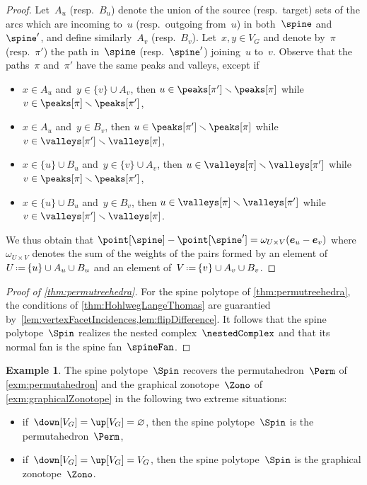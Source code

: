 \documentclass{amsart}
\theoremstyle{definition}
\newtheorem{example}[theorem]{Example}
\renewcommand{\b}[1]{{\boldsymbol{#1}}} %
\newcommand{\ssm}{\smallsetminus} %
\newcommand{\eqdef}{\mbox{\,\raisebox{0.2ex}{\scriptsize\ensuremath{\mathrm:}}\ensuremath{=}\,}} %
\newcommand{\weight}{\omega} %
\begin{document}
\begin{proof}
  Let~$A_u$ (resp.~$B_u$) denote the union of the source (resp.~target) sets of the arcs which are incoming to~$u$ (resp.~outgoing from~$u$) in both~$\spine$ and~$\spine'$, and define similarly~$A_v$ (resp.~$B_v$).
  Let~$x,y \in V_G$ and denote by~$\pi$ (resp.~$\pi'$) the path in~$\spine$ (resp.~$\spine'$) joining~$u$ to~$v$.
  Observe that the paths~$\pi$ and~$\pi'$ have the same peaks and valleys, except if
  \begin{itemize}
    \item $x \in A_u$ and~$y \in \{v\} \cup A_v$, then $u \in \peaks[\pi'] \ssm \peaks[\pi]$ while~$v \in \peaks[\pi] \ssm \peaks[\pi']$,
    \item $x \in A_u$ and~$y \in B_v$, then $u \in \peaks[\pi'] \ssm \peaks[\pi]$ while~$v \in \valleys[\pi'] \ssm \valleys[\pi]$,
    \item $x \in \{u\} \cup B_u$ and~$y \in \{v\} \cup A_v$, then $u \in \valleys[\pi] \ssm \valleys[\pi']$ while~$v \in \peaks[\pi] \ssm \peaks[\pi']$,
    \item $x \in \{u\} \cup B_u$ and~$y \in B_v$, then $u \in \valleys[\pi] \ssm \valleys[\pi']$ while~$v \in \valleys[\pi'] \ssm \valleys[\pi]$.
  \end{itemize}
  We thus obtain that
  \(
    \point[\spine] - \point[\spine'] = \weight_{U \times V} (\b{e}_u - \b{e}_v)
  \)
  where~$\weight_{U \times V}$ denotes the sum of the weights of the pairs formed by an element of~$U \eqdef \{u\} \cup A_u \cup B_u$ and an element of~$V \eqdef \{v\} \cup A_v \cup B_v$.
\end{proof}

\begin{proof}[Proof of \cref{thm:permutreehedra}]
  For the spine polytope of \cref{thm:permutreehedra}, the conditions of \cref{thm:HohlwegLangeThomas} are guarantied by~\cref{lem:vertexFacetIncidences,lem:flipDifference}.
  It follows that the spine polytope~$\Spin$ realizes the nested complex~$\nestedComplex$ and that its normal fan is the spine fan~$\spineFan$.
\end{proof}

\begin{example}
  \label{exm:permutahedronGraphicalZonotope}
  The spine polytope~$\Spin$ recovers the permutahedron~$\Perm$ of \cref{exm:permutahedron} and the graphical zonotope~$\Zono$ of \cref{exm:graphicalZonotope} in the following two extreme situations:
  \begin{itemize}
    \item if~$\down[V_G] = \up[V_G] = \varnothing$, then the spine polytope~$\Spin$ is the permutahedron~$\Perm$,
    \item if~$\down[V_G] = \up[V_G] = V_G$, then the spine polytope~$\Spin$ is the graphical zonotope~$\Zono$.
  \end{itemize}
\end{example}
\end{document}
